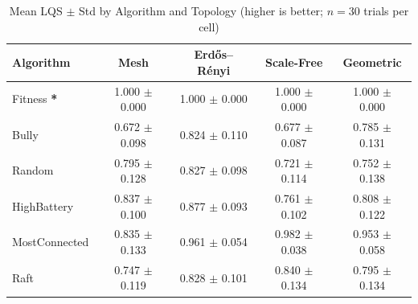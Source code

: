 \begin{table}[htbp]
\centering
\caption{Mean LQS $\pm$ Std by Algorithm and Topology (higher is better; $n=30$ trials per cell)}
\label{tab:lqs_summary}
\begin{tabular}{lcccc}
\toprule
  Algorithm & Mesh & Erdős–Rényi & Scale-Free & Geometric \\
\midrule
  Fitness \textbf{*} & 1.000 $\pm$ 0.000 & 1.000 $\pm$ 0.000 & 1.000 $\pm$ 0.000 & 1.000 $\pm$ 0.000 \\
  Bully & 0.672 $\pm$ 0.098 & 0.824 $\pm$ 0.110 & 0.677 $\pm$ 0.087 & 0.785 $\pm$ 0.131 \\
  Random & 0.795 $\pm$ 0.128 & 0.827 $\pm$ 0.098 & 0.721 $\pm$ 0.114 & 0.752 $\pm$ 0.138 \\
  HighBattery & 0.837 $\pm$ 0.100 & 0.877 $\pm$ 0.093 & 0.761 $\pm$ 0.102 & 0.808 $\pm$ 0.122 \\
  MostConnected & 0.835 $\pm$ 0.133 & 0.961 $\pm$ 0.054 & 0.982 $\pm$ 0.038 & 0.953 $\pm$ 0.058 \\
  Raft & 0.747 $\pm$ 0.119 & 0.828 $\pm$ 0.101 & 0.840 $\pm$ 0.134 & 0.795 $\pm$ 0.134 \\
\bottomrule
\end{tabular}
\end{table}